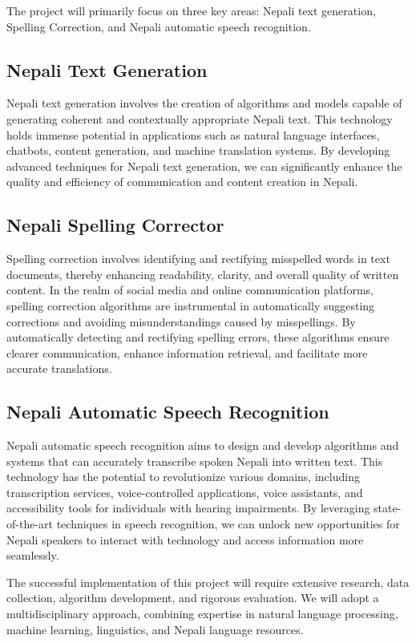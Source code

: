 The project will primarily focus on three key areas: Nepali text generation, Spelling Correction, and Nepali automatic speech recognition.

\subsection{Nepali Text Generation}
Nepali text generation involves the creation of algorithms and models capable of generating coherent and contextually appropriate Nepali text. This technology holds immense potential in applications such as natural language interfaces, chatbots, content generation, and machine translation systems. By developing advanced techniques for Nepali text generation, we can significantly enhance the quality and efficiency of communication and content creation in Nepali.

\subsection{Nepali Spelling Corrector}
Spelling correction involves identifying and rectifying misspelled words in text documents, thereby enhancing readability, clarity, and overall quality of written content. In the realm of social media and online communication platforms, spelling correction algorithms are instrumental in automatically suggesting corrections and avoiding misunderstandings caused by misspellings. By automatically detecting and rectifying spelling errors, these algorithms ensure clearer communication, enhance information retrieval, and facilitate more accurate translations.


\subsection{Nepali Automatic Speech Recognition}
Nepali automatic speech recognition aims to design and develop algorithms and systems that can accurately transcribe spoken Nepali into written text. This technology has the potential to revolutionize various domains, including transcription services, voice-controlled applications, voice assistants, and accessibility tools for individuals with hearing impairments. By leveraging state-of-the-art techniques in speech recognition, we can unlock new opportunities for Nepali speakers to interact with technology and access information more seamlessly.

The successful implementation of this project will require extensive research, data collection, algorithm development, and rigorous evaluation. We will adopt a multidisciplinary approach, combining expertise in natural language processing, machine learning, linguistics, and Nepali language resources.

